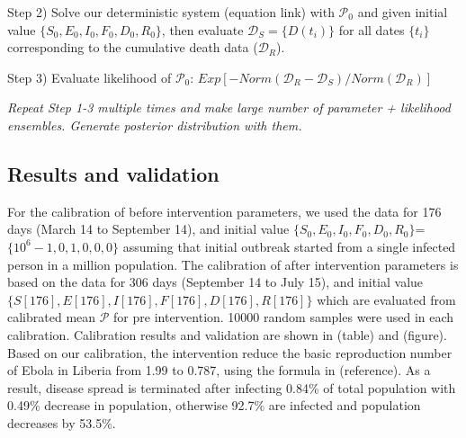 Step 2) Solve our deterministic system (equation link) with $\mathcal{P}_0$ and given initial value $\{S_0,E_0,I_0,F_0,D_0,R_0\}$, then evaluate $\mathcal{D}_S=\{D(t_i)\}$ for all dates $\{t_i\}$ corresponding to the cumulative death data ($\mathcal{D}_R$).

Step 3) Evaluate likelihood of $\mathcal{P}_0$: $Exp[-Norm(\mathcal{D}_R-\mathcal{D}_S)/Norm(\mathcal{D}_R)]$

\emph{Repeat Step 1-3 multiple times and make large number of {parameter + likelihood} ensembles. Generate posterior distribution with them.}

\subsection{Results and validation}
For the calibration of before intervention parameters, we used the data for 176 days (March 14 to September 14), and initial value $\{S_0,E_0,I_0,F_0,D_0,R_0\}$=$\{10^6-1,0,1,0,0,0\}$ assuming that initial outbreak started from a single infected person in a million population. The calibration of after intervention parameters is based on the data for 306 days (September 14 to July 15), and initial value $\{S[176],E[176],I[176],F[176],D[176],R[176]\}$ which are evaluated from calibrated mean $\mathcal{P}$ for pre intervention. 10000 random samples were used in each calibration. Calibration results and validation are shown in (table) and (figure).\\
Based on our calibration, the intervention reduce the basic reproduction number of Ebola in Liberia from 1.99 to 0.787, using the formula in (reference). As a result, disease spread is terminated after infecting 0.84\% of total population with 0.49\% decrease in population, otherwise 92.7\% are infected and population decreases by 53.5\%.\\


